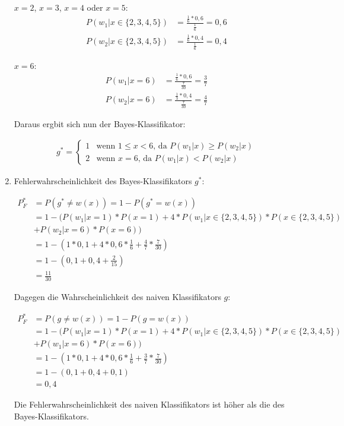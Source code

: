 \documentclass[a4paper,12pt]{article}
\begin{document}
\begin{enumerate}[1.)]
	$x = 2$, $x = 3$, $x = 4$ oder $x = 5$:
	\begin{align*}
		P(w_1 | x \in \{2,3,4,5\}) &= \frac{\frac{1}{6} * 0,6}{\frac{1}{6}} = 0,6 \\
		P(w_2 | x \in \{2,3,4,5\}) &= \frac{\frac{1}{6} * 0,4}{\frac{1}{6}} = 0,4
	\end{align*}

	$x = 6$:
	\begin{align*}
		P(w_1 | x=6) &= \frac{\frac{1}{6} * 0,6}{\frac{7}{30}} = \frac{3}{7} \\
		P(w_2 | x=6) &= \frac{\frac{1}{3} * 0,4}{\frac{7}{30}} = \frac{4}{7}
	\end{align*}

	Daraus ergbit sich nun der Bayes-Klassifikator:

	\begin{align*}
		g^* =  \begin{cases}
			1 & \text{wenn } 1 \leq x < 6 \text{, da } P(w_1|x) \geq P(w_2|x) \\
		    2 & \text{wenn } x = 6 \text{, da } P(w_1|x) < P(w_2|x)
		\end{cases} 
	\end{align*}

	\item 

	Fehlerwahrscheinlichkeit des Bayes-Klassifikators $g^*$:

	\begin{align*}
		P_F^* &= P(g^* \neq w(x)) = 1- P(g^* = w(x)) \\
			  &= 1 - (P(w_1|x=1) * P(x=1) + 4 * P(w_1 | x \in \{2,3,4,5\}) * P(x \in \{2,3,4,5\}) \\ & + P(w_2 | x = 6) * P(x = 6)) \\
			  &= 1 - (1*0,1 + 4*0,6*\frac{1}{6}+\frac{4}{7}*\frac{7}{30}) \\
			  &= 1 - (0,1 + 0,4 + \frac{2}{15}) \\
			  &= \frac{11}{30}
	\end{align*}

	Dagegen die Wahrscheinlichkeit des naiven Klassifikators $g$:

	\begin{align*}
		P_F^* &= P(g \neq w(x)) = 1 - P(g = w(x)) \\
			  &= 1 - (P(w_1|x=1) * P(x=1) + 4 * P(w_1 | x \in \{2,3,4,5\}) * P(x \in \{2,3,4,5\}) \\ & + P(w_1 | x = 6) * P(x = 6)) \\
			  &= 1 - (1*0,1 + 4*0,6*\frac{1}{6}+\frac{3}{7}*\frac{7}{30}) \\
			  &= 1 - (0,1 + 0,4 + 0,1) \\
			  &= 0,4
	\end{align*}
	
	Die Fehlerwahrscheinlichkeit des naiven Klassifikators ist höher als die des Bayes-Klassifikators.

\end{enumerate}



\end{document}
